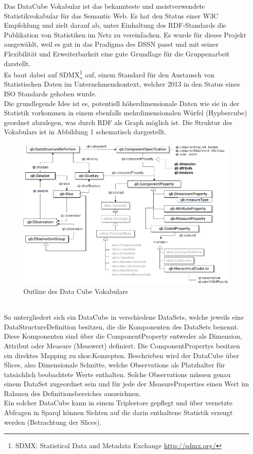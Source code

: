 \documentclass{article}
\begin{document}
Das DataCube Vokabular ist das bekannteste und meistverwendete Statistikvokabular für das Semantic Web. Es hat den Status einer W3C Empfehlung\cite{datacube} und zielt darauf ab, unter Einhaltung des RDF-Standards die Publikation von Statistiken im Netz zu vereinfachen. Es wurde für dieses Projekt ausgewählt, weil es gut in das Pradigma des DSSN passt und mit seiner Flexibilität und Erweiterbarkeit eine gute Grundlage für die Gruppenarbeit darstellt.\\
Es baut dabei auf SDMX\footnote{SDMX: Statistical Data and Metadata Exchange \url{http://sdmx.org/}} auf, einem Standard für den Austausch von Statistischen Daten im Unternehmenskontext, welcher 2013 in den Status eines ISO Standards\cite{iso} gehoben wurde.\\
Die grundlegende Idee ist es, potentiell höherdimensionale Daten wie sie in der Statistik vorkommen in einem ebenfalls mehrdimensionalen Würfel (Hypbercube) geordnet abzulegen, was durch RDF als Graph möglich ist. Die Struktur des Vokabulars ist in Abbildung 1 schematisch dargestellt.
\begin{figure}[t]
\centering
\includegraphics[width=\textwidth]{qb-fig1.png}
\caption{Outline des Data Cube Vokabulars}
\label{fig:my_label}
\end{figure}\\
So untergliedert sich ein DataCube in verschiedene DataSets, welche jeweils eine DataStructureDefinition besitzen, die die Komponenten des DataSets benennt. Diese Komponenten sind über die ComponentProperty entweder als Dimension, Attribut oder Measure (Messwert) definiert. Die ComponentPropertys besitzen ein direktes Mapping zu skos:Konzepten. Beschrieben wird der DataCube über Slices, also Dimensionale Schnitte, welche Observations als Platzhalter für tatsächlich beobachtete Werte enthalten. Solche Observations müssen genau einem DataSet zugeordnet sein und für jede der MeasureProperties einen Wert im Rahmen des Definitionsbereiches auszeichnen.\\
Ein solcher DataCube kann in einem Triplestore gepflegt und über vernetzte Abfragen in Sparql können Sichten auf die darin enthaltene Statistik erzeugt werden (Betrachtung der Slices).
\end{document}
